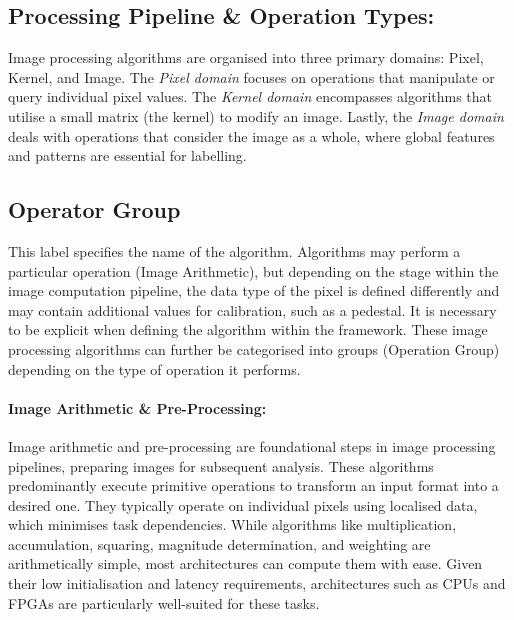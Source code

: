 \subsection{Processing Pipeline \& Operation Types:}
Image processing algorithms are organised into three primary domains: Pixel, Kernel, and Image. The \textit{Pixel domain} focuses on operations that manipulate or query individual pixel values. The \textit{Kernel domain} encompasses algorithms that utilise a small matrix (the kernel) to modify an image. Lastly, the \textit{Image domain} deals with operations that consider the image as a whole, where global features and patterns are essential for labelling.

\subsection{Operator Group }
This label specifies the name of the algorithm. Algorithms may perform a particular operation (\eg Image Arithmetic), but depending on the stage within the image computation pipeline, the data type of the pixel is defined differently and may contain additional values for calibration, such as a pedestal. It is necessary to be explicit when defining the algorithm within the framework. These image processing algorithms can further be categorised into groups (Operation Group) depending on the type of operation it performs.

\paragraph{Image Arithmetic \& Pre-Processing:} 
Image arithmetic and pre-processing are foundational steps in image processing pipelines, preparing images for subsequent analysis. These algorithms predominantly execute primitive operations to transform an input format into a desired one. They typically operate on individual pixels using localised data, which minimises task dependencies. While algorithms like multiplication, accumulation, squaring, magnitude determination, and weighting are arithmetically simple, most architectures can compute them with ease. Given their low initialisation and latency requirements, architectures such as CPUs and FPGAs are particularly well-suited for these tasks.

